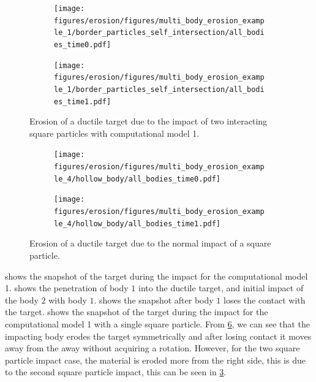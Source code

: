 \begin{figure}[!htpb]
  \centering
  \begin{subfigure}{0.48\textwidth}
    \centering
    \texttt{[image: figures/erosion/figures/multi\_body\_erosion\_example\_1/border\_particles\_self\_intersection/all\_bodies\_time0.pdf]}
    \subcaption{}
    \label{fig:mpe-1-border-a}
  \end{subfigure}
  \begin{subfigure}{0.48\textwidth}
    \centering
    \texttt{[image: figures/erosion/figures/multi\_body\_erosion\_example\_1/border\_particles\_self\_intersection/all\_bodies\_time1.pdf]}
    \subcaption{}
    \label{fig:mpe-1-border-b}
  \end{subfigure}
  \caption{Erosion of a ductile target due to the impact of two interacting
    square particles with computational model 1.}
\label{fig:mpe-1-border}
\end{figure}
\begin{figure}[!htpb]
  \centering
  \begin{subfigure}{0.48\textwidth}
    \centering
    \texttt{[image: figures/erosion/figures/multi\_body\_erosion\_example\_4/hollow\_body/all\_bodies\_time0.pdf]}
    \subcaption{}
    \label{fig:mpe-4-border-a}
  \end{subfigure}
  \begin{subfigure}{0.48\textwidth}
    \centering
    \texttt{[image: figures/erosion/figures/multi\_body\_erosion\_example\_4/hollow\_body/all\_bodies\_time1.pdf]}
    \subcaption{}
    \label{fig:mpe-4-border-b}
  \end{subfigure}
  \caption{Erosion of a ductile target due to the normal impact of a
    square particle.}
  \label{fig:mpe-4-border}
\end{figure}
 shows the snapshot of the target during the impact for
the computational model 1.  shows the penetration of
body $1$ into the ductile target, and initial impact of the body $2$ with body
$1$.  shows the snapshot after body $1$ loses the
contact with the target.  shows the snapshot of the
target during the impact for the computational model 1 with a single square
particle. From \cref{fig:mpe-4-border}, we can see that the impacting body
erodes the target symmetrically and after losing contact it moves away from the
away without acquiring a rotation. However, for the two square particle impact
case, the material is eroded more from the right side, this is due to the second
square particle impact, this can be seen in \cref{fig:mpe-1-border}.

